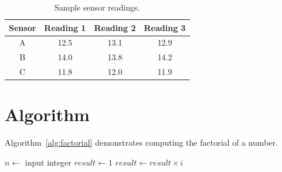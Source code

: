 \documentclass[12pt]{article}
\begin{document}
	\begin{table}[h]
		\centering
		\begin{tabular}{|c|c|c|c|}
			\hline
			Sensor & Reading 1 & Reading 2 & Reading 3 \\
			\hline
			A & 12.5 & 13.1 & 12.9 \\
			\hline
			B & 14.0 & 13.8 & 14.2 \\
			\hline
			C & 11.8 & 12.0 & 11.9 \\
			\hline
		\end{tabular}
		\caption{Sample sensor readings.}
		\label{tab:readings}
	\end{table}
	\section{Algorithm}
	Algorithm~\ref{alg:factorial} demonstrates computing the factorial of a number.
	
	\begin{algorithmic}
		\State $n \gets$ input integer
		\State $result \gets 1$
		\State $result \gets result \times i$
		\EndFor
	\end{algorithmic}
	\label{alg:factorial}
\end{document}
